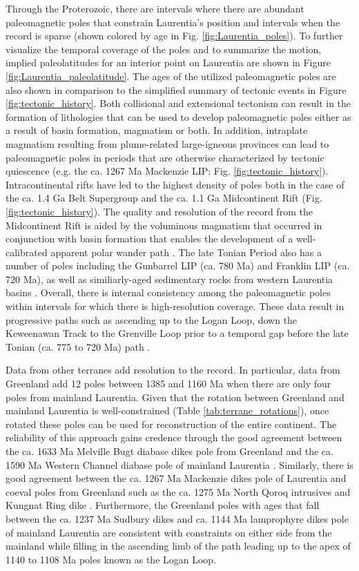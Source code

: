 \documentclass[11pt,letterpaper]{article}
\begin{document}
Through the Proterozoic, there are intervals where there are abundant paleomagnetic poles that constrain Laurentia's position and intervals when the record is sparse (shown colored by age in Fig. \ref{fig:Laurentia_poles}). To further visualize the temporal coverage of the poles and to summarize the motion, implied paleolatitudes for an interior point on Laurentia are shown in Figure \ref{fig:Laurentia_paleolatitude}. The ages of the utilized paleomagnetic poles are also shown in comparison to the simplified summary of tectonic events in Figure \ref{fig:tectonic_history}. Both collisional and extensional tectonism can result in the formation of lithologies that can be used to develop paleomagnetic poles either as a result of basin formation, magmatism or both. In addition, intraplate magmatism resulting from plume-related large-igneous provinces can lead to paleomagnetic poles in periods that are otherwise characterized by tectonic quiescence (e.g. the ca. 1267 Ma Mackenzie LIP; Fig. \ref{fig:tectonic_history}). Intracontinental rifts have led to the highest density of poles both in the case of the ca. 1.4 Ga Belt Supergroup and the ca. 1.1 Ga Midcontinent Rift (Fig. \ref{fig:tectonic_history}). The quality and resolution of the record from the Midcontinent Rift is aided by the voluminous magmatism that occurred in conjunction with basin formation that enables the development of a well-calibrated apparent polar wander path \citep{Swanson-Hysell2019a}. The late Tonian Period also has a number of poles including the Gunbarrel LIP (ca. 780 Ma) and Franklin LIP (ca. 720 Ma), as well as similiarly-aged sedimentary rocks from western Laurentia basins \citep{Eyster2019a}. Overall, there is internal consistency among the paleomagnetic poles within intervals for which there is high-resolution coverage. These data result in progressive paths such as ascending up to the Logan Loop, down the Keweenawan Track \citep{Swanson-Hysell2019a} to the Grenville Loop prior to a temporal gap before the late Tonian (ca. 775 to 720 Ma) path \citep{Eyster2019a}. 

Data from other terranes add resolution to the record. In particular, data from Greenland add 12 poles between 1385 and 1160 Ma when there are only four poles from mainland Laurentia. Given that the rotation between Greenland and mainland Laurentia is well-constrained (Table \ref{tab:terrane_rotations}), once rotated these poles can be used for reconstruction of the entire continent. The reliability of this approach gains credence through the good agreement between the ca. 1633 Ma Melville Bugt diabase dikes pole from Greenland \citep{Halls2011a} and the ca. 1590 Ma Western Channel diabase pole of mainland Laurentia \citep{Irving1972a}. Similarly, there is good agreement between the ca. 1267 Ma Mackenzie dikes pole of Laurentia \citep{Buchan2000a} and coeval poles from Greenland such as the ca. 1275 Ma North Qoroq intrusives \citep{Piper1992a} and Kungnat Ring dike \citep{Piper1977a}. Furthermore, the Greenland poles with ages that fall between the ca. 1237 Ma Sudbury dikes and ca. 1144 Ma lamprophyre dikes pole of mainland Laurentia are consistent with constraints on either side from the mainland while filling in the ascending limb of the path leading up to the apex of 1140 to 1108 Ma poles known as the Logan Loop.
\end{document}
